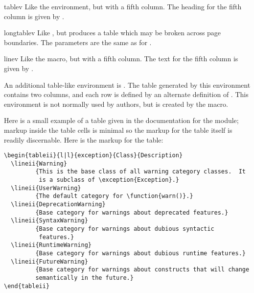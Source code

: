 \documentclass{howto}
\begin{document}
    \begin{envdesc}{tablev}{}
      Like the  environment, but with a fifth column.
      The heading for the fifth column is given by .
    \end{envdesc}

    \begin{envdesc}{longtablev}{\unspecified}
      Like , but produces a table which may be broken
      across page boundaries.  The parameters are the same as for
      .
    \end{envdesc}

    \begin{macrodesc}{linev}{}
      Like the  macro, but with a fifth column.  The
      text for the fifth column is given by .
    \end{macrodesc}


    An additional table-like environment is .  The
    table generated by this environment contains two columns, and each
    row is defined by an alternate definition of
    .  This environment is not normally used by
    authors, but is created by the  macro.

    Here is a small example of a table given in the documentation for
    the  module; markup inside the table cells is
    minimal so the markup for the table itself is readily discernable.
    Here is the markup for the table:

\begin{verbatim}
\begin{tableii}{l|l}{exception}{Class}{Description}
  \lineii{Warning}
         {This is the base class of all warning category classes.  It
          is a subclass of \exception{Exception}.}
  \lineii{UserWarning}
         {The default category for \function{warn()}.}
  \lineii{DeprecationWarning}
         {Base category for warnings about deprecated features.}
  \lineii{SyntaxWarning}
         {Base category for warnings about dubious syntactic
          features.}
  \lineii{RuntimeWarning}
         {Base category for warnings about dubious runtime features.}
  \lineii{FutureWarning}
         {Base category for warnings about constructs that will change
         semantically in the future.}
\end{tableii}
\end{verbatim}
\end{document}
